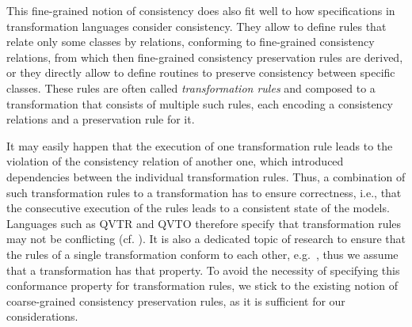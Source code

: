 This fine-grained notion of consistency does also fit well to how specifications in transformation languages consider consistency.
They allow to define rules that relate only some classes by relations, conforming to fine-grained consistency relations, from which then fine-grained consistency preservation rules are derived, or they directly allow to define routines to preserve consistency between specific classes.
These rules are often called \emph{transformation rules} and composed to a transformation that consists of multiple such rules, each encoding a consistency relations and a preservation rule for it.

It may easily happen that the execution of one transformation rule leads to the violation of the consistency relation of another one, which introduced dependencies between the individual transformation rules.
Thus, a combination of such transformation rules to a transformation has to ensure correctness, i.e., that the consecutive execution of the rules leads to a consistent state of the models.
Languages such as \gls{QVTR} and \gls{QVTO} therefore specify that transformation rules may not be conflicting (cf. \cite[7.10.2.]{qvt}).
It is also a dedicated topic of research to ensure that the rules of a single transformation conform to each other, e.g.\ \cite{cuadrado2017tse,cabot2010VerificationInvariants-JSS}, thus we assume that a transformation has that property.
To avoid the necessity of specifying this conformance property for transformation rules, we stick to the existing notion of coarse-grained consistency preservation rules, as it is sufficient for our considerations.

